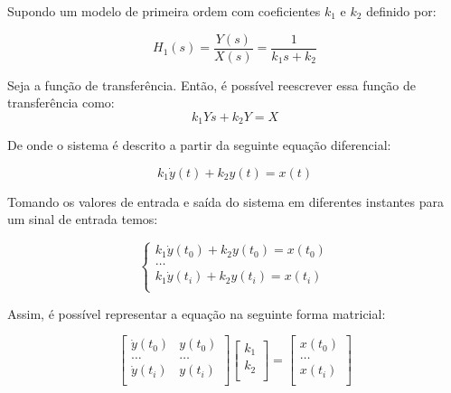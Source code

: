 \documentclass[a4paper,11pt]{article}
\begin{document}
Supondo um modelo de primeira ordem com coeficientes $k_1$ e $k_2$ definido por:

\begin{equation}\label{eq:firstordertf}
    H_1(s) = \frac{Y(s)}{X(s)} = \frac{1}{k_1 s+ k_2}
\end{equation}


Seja a função de transferência. Então, é possível reescrever essa função de transferência como:
\begin{equation}
k_1 Ys + k_2 Y  = X
\end{equation}

De onde o sistema é descrito a partir da seguinte equação diferencial:

\begin{equation}
k_1 \dot{y}(t) + k_2 y(t) = x(t)
\end{equation}

Tomando os valores de entrada e saída do sistema em diferentes instantes para um sinal de entrada temos:

\begin{equation}
\left\{\begin{array}{c}
    k_1 \dot{y}(t_0) + k_2 y(t_0) = x(t_0)  \\
    \dots\\
    k_1 \dot{y}(t_i) + k_2 y(t_i) = x(t_i)  \\
\end{array} \right.
\end{equation}


Assim, é possível representar a equação na seguinte forma matricial:

\begin{equation}
\left[\begin{array}{cc}
    \dot{y}(t_0) & y(t_0)\\
    \dots  & \dots \\
    \dot{y}(t_i) & y(t_i)\\
\end{array} \right]
\left[\begin{array}{c}
    k_1\\
    k_2\\
\end{array} \right]
=
\left[\begin{array}{c}
    x(t_0)  \\
    \dots\\
    x(t_i)  \\
\end{array} \right]
\end{equation}
\end{document}
